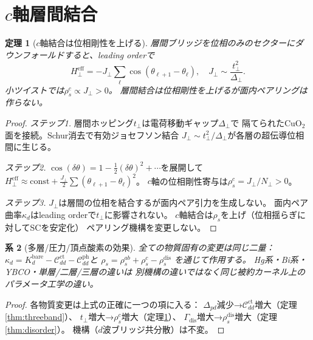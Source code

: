 \documentclass[12pt]{article}
\theoremstyle{plain}
\newtheorem{theorem}{定理}[section]
\newtheorem{corollary}[theorem]{系}
\theoremstyle{definition}
\numberwithin{equation}{section}
\newcommand{\eff}{\mathrm{eff}}
\begin{document}
\section{$c$軸層間結合}\label{sec:caxis}

\begin{theorem}[$c$軸結合は位相剛性を上げる]\label{thm:caxis}
層間ブリッジを位相のみのセクターにダウンフォールドすると、leading orderで
\begin{equation}
H_\perp^{\eff}=-J_\perp\sum_\ell\cos(\theta_{\ell+1}-\theta_\ell),
\quad J_\perp\sim\frac{t_\perp^2}{\Delta_\perp}.
\end{equation}
小ツイストでは$\boxed{\rho_s^c\propto J_\perp>0}$。
層間結合は位相剛性を上げるが面内ペアリングは作らない。
\end{theorem}

\begin{proof}
\emph{ステップ1.}
層間ホッピング$t_\perp$は電荷移動ギャップ$\Delta_\perp$で
隔てられたCuO$_2$面を接続。Schur消去で有効ジョセフソン結合
$J_\perp\sim t_\perp^2/\Delta_\perp$が各層の超伝導位相間に生じる。

\emph{ステップ2.}
$\cos(\delta\theta)=1-\frac{1}{2}(\delta\theta)^2+\cdots$を展開して
$H_\perp^{\eff}\approx\text{const}+\frac{J_\perp}{2}\sum(\theta_{\ell+1}-\theta_\ell)^2$。
$c$軸の位相剛性寄与は$\rho_s^c=J_\perp/N_\perp>0$。

\emph{ステップ3.}
$J_\perp$は層間の位相を結合するが面内ペア引力を生成しない。
面内ペア曲率$\kappa_d$はleading orderで$t_\perp$に影響されない。
$c$軸結合は$\rho_s$を上げ（位相揺らぎに対してSCを安定化）
ペアリング機構を変更しない。
\end{proof}

\begin{corollary}[多層/圧力/頂点酸素の効果]\label{cor:material}
全ての物質固有の変更は同じ二量：
$\kappa_d=K_d^{\mathrm{bare}}-\mathcal{C}_{dd}^{\mathrm{ct}}
-\mathcal{C}_{dd}^{\mathrm{ph}}$と
$\rho_s=\rho_s^{ab}+\rho_s^c-\rho_s^{\mathrm{dis}}$
を通じて作用する。
Hg系・Bi系・YBCO・単層/二層/三層の違いは
別機構の違いではなく同じ被約カーネル上のパラメータ工学の違い。
\end{corollary}

\begin{proof}
各物質変更は上式の正確に一つの項に入る：
$\Delta_{pd}$減少→$\mathcal{C}_{dd}^{\mathrm{ct}}$増大（定理\ref{thm:threeband}）、
$t_\perp$増大→$\rho_s^c$増大（定理\ref{thm:caxis}）、
$\Gamma_{\mathrm{dis}}$増大→$\rho_s^{\mathrm{dis}}$増大（定理\ref{thm:disorder}）。
機構（$d$波ブリッジ共分散）は不変。
\end{proof}
\end{document}
